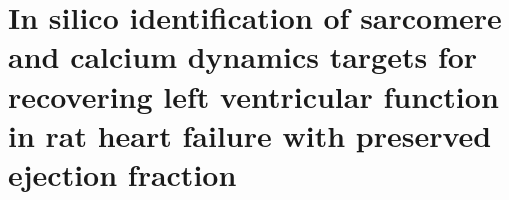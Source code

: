\chapter{In silico identification of sarcomere and calcium dynamics targets for 
recovering left ventricular function in rat heart failure with preserved 
ejection fraction}\label{cha:chapter7}
%
%
%